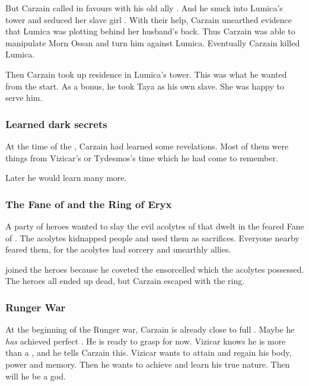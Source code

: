 But Carzain called in favours with his old ally .
And he snuck into Lumica's tower and seduced her slave girl .
With their help, Carzain unearthed evidence that Lumica was plotting behind her husband's back.
Thus Carzain was able to manipulate Morn Ossan and turn him against Lumica.
Eventually Carzain killed Lumica. 

Then Carzain took up residence in Lumica's tower.
This was what he wanted from the start. 
As a bonus, he took Taya as his own slave. 
She was happy to serve him.






\subsubsection{Learned dark secrets}
At the time of the , Carzain had learned some  revelations.
Most of them were things from Vizicar's or Tydesmos's time which he had come to remember. 

Later he would learn many more. 





\subsubsection{The Fane of \KulYana and the Ring of Eryx}
A party of heroes wanted to slay the evil acolytes of  that dwelt in the feared Fane of \KulYana. 
The acolytes kidnapped people and used them as sacrifices. 
Everyone nearby feared them, for the acolytes had sorcery and unearthly allies. 

\CarzainShachar joined the heroes because he coveted the ensorcelled  which the acolytes possessed.
The heroes all ended up dead, but Carzain escaped with the ring.






\subsubsection{Runger War}
At the beginning of the Runger war, Carzain is already close to full \kenosis. 
Maybe he \emph{has} achieved perfect \kenosis. 
He is ready to grasp for \apotheosis{} now.
Vizicar knows he is more than a \human, and he tells Carzain this. 
Vizicar wants to attain \kenosis{} and regain his body, power and memory. 
Then he wants to achieve \apotheosis{} and learn his true nature.
Then will he be a god. 


